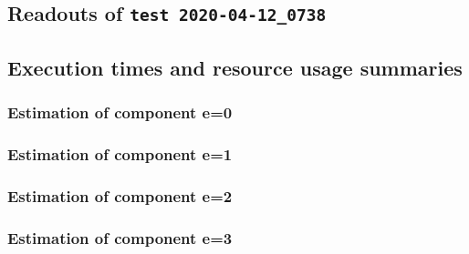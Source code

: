\documentclass[10pt]{article}
\begin{document}
\begin{appendices}
\section{Readouts of \texttt{test 2020-04-12\_0738}}
\subsection{Execution times and resource usage summaries}
\subsubsection{Estimation of component e=0}
 \begin{tcolorbox}[breakable, size=fbox, boxrule=1pt, pad at break*=1mm,colframe=cellborder]    
 
\end{tcolorbox}
\subsubsection{Estimation of component e=1}
\begin{tcolorbox}[breakable, size=fbox, boxrule=1pt, pad at break*=1mm,colframe=cellborder]    
 
\end{tcolorbox}
\subsubsection{Estimation of component e=2}
 \begin{tcolorbox}[breakable, size=fbox, boxrule=1pt, pad at break*=1mm,colframe=cellborder]    
 
\end{tcolorbox}
\subsubsection{Estimation of component e=3}
 \begin{tcolorbox}[breakable, size=fbox, boxrule=1pt, pad at break*=1mm,colframe=cellborder]    
 
\end{tcolorbox}
\end{appendices}
\end{document}
